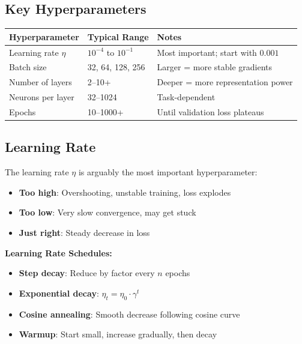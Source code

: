 \subsection{Key Hyperparameters}

\begin{center}
\begin{tabular}{lll}
\toprule
\textbf{Hyperparameter} & \textbf{Typical Range} & \textbf{Notes} \\
\midrule
Learning rate $\eta$ & $10^{-4}$ to $10^{-1}$ & Most important; start with $0.001$ \\
Batch size & 32, 64, 128, 256 & Larger = more stable gradients \\
Number of layers & 2--10+ & Deeper = more representation power \\
Neurons per layer & 32--1024 & Task-dependent \\
Epochs & 10--1000+ & Until validation loss plateaus \\
\bottomrule
\end{tabular}
\end{center}

\subsection{Learning Rate}

The learning rate $\eta$ is arguably the most important hyperparameter:

\begin{itemize}
    \item \textbf{Too high}: Overshooting, unstable training, loss explodes
    \item \textbf{Too low}: Very slow convergence, may get stuck
    \item \textbf{Just right}: Steady decrease in loss
\end{itemize}

\textbf{Learning Rate Schedules:}
\begin{itemize}
    \item \textbf{Step decay}: Reduce by factor every $n$ epochs
    \item \textbf{Exponential decay}: $\eta_t = \eta_0 \cdot \gamma^t$
    \item \textbf{Cosine annealing}: Smooth decrease following cosine curve
    \item \textbf{Warmup}: Start small, increase gradually, then decay
\end{itemize}

